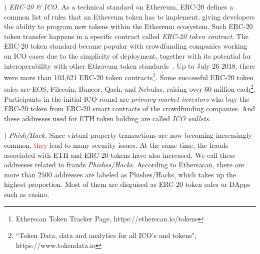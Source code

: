 


) \emph{ERC-20 \& ICO.}
As a technical standard on Ethereum, ERC-20 defines a common list of rules that an Ethereum token has to implement, giving developers the ability to program new tokens within the Ethereum ecosystem. Such ERC-20 token transfer happens in a specific contract called \emph{ERC-20 token contract}. The ERC-20 token standard became popular with crowdfunding companies working on ICO cases due to the simplicity of deployment, together with its potential for interoperability with other Ethereum token standards~\cite{erc-20}. Up to July 26 2018, there were more than 103,621 ERC-20 token contracts\footnote{Etherscan Token Tracker Page, https://etherscan.io/tokens}. Some successful ERC-20 token sales are EOS, Filecoin, Bancor, Qash, and Nebulas, raising over 60 million each\footnote{``Token Data, data and analytics for all ICO's and tokens", https://www.tokendata.io}. Participants in the initial ICO round are \emph{primary market investors} who buy the ERC-20 token from ERC-20 smart contracts of the crowdfunding companies. And these addresses used for ETH token holding are called \emph{ICO wallets}.

) \emph{Phish/Hack.}
Since virtual property transactions are now becoming increasingly common, \textcolor{red}{they} lead to many security issues. At the same time, the frauds associated with ETH and ERC-20 tokens have also increased. We call these addresses related to frauds \emph{Phishes/Hacks}. According to Ethersacan, there are more than $2500$ addresses are labeled as Phishes/Hacks, which takes up the highest proportion. Most of them are disguised as ERC-20 token sales or DApps such as casino. 




